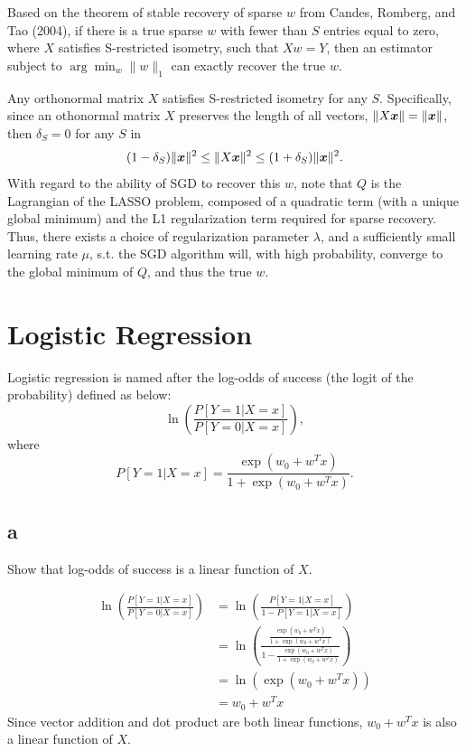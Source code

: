 \documentclass{article}
\begin{document}
Based on the theorem of stable recovery of sparse $w$ from Candes, Romberg, and Tao (2004), if there is a true sparse $w$ with fewer than $S$ entries equal to zero, where $X$ satisfies S-restricted isometry, such that $Xw = Y$, then an estimator subject to $\arg\min_w \|w\|_1$ can exactly recover the true $w$.

Any orthonormal matrix $X$ satisfies S-restricted isometry for any $S$.
Specifically, since an othonormal matrix $X$ preserves the length of all vectors, $\|X\bm{x}\| = \|\bm{x}\|$, then $\delta_S = 0$ for any $S$ in
$$(1 - \delta_S)\|\bm{x}\|^2 \leq \|X\bm{x}\|^2 \leq (1 + \delta_S)\|\bm{x}\|^2.$$
With regard to the ability of SGD to recover this $w$, note that $Q$ is the Lagrangian of the LASSO problem, composed of a quadratic term (with a unique global minimum) and the L1 regularization term required for sparse recovery.
Thus, there exists a choice of regularization parameter $\lambda$, and a sufficiently small learning rate $\mu$, s.t. the SGD algorithm will, with high probability, converge to the global minimum of $Q$, and thus the true $w$.

\section{Logistic Regression}
Logistic regression is named after the log-odds of success (the logit of the probability) defined as below:
$$\ln\left(\frac{P[Y=1|X=x]}{P[Y=0|X=x]}\right),$$
where
$$P[Y=1|X=x] = \frac{\exp(w_0 + w^Tx)}{1 + \exp(w_0 + w^Tx)}.$$

\subsection{a}
Show that log-odds of success is a linear function of $X$.

\begin{align*}
    \ln\left(\frac{P[Y=1|X=x]}{P[Y=0|X=x]}\right) &= \ln\left(\frac{P[Y=1|X=x]}{1 - P[Y=1|X=x]}\right)\tag*{Since $Y$ has two possible values}\\
    &= \ln\left(\frac{\frac{\exp(w_0 + w^Tx)}{1 + \exp(w_0 + w^Tx)}}{1 - \frac{\exp(w_0 + w^Tx)}{1 + \exp(w_0 + w^Tx)}}\right)\tag*{Substitute for $P[Y=1|X=x]$}\\
    &= \ln\left(\exp(w_0 + w^Tx)\right)\tag*{Simplify}\\
    &= w_0 + w^Tx\tag*{$\ln\left(e^x\right) = x$}
\end{align*}
Since vector addition and dot product are both linear functions, $w_0 + w^Tx$ is also a linear function of $X$.
\end{document}

